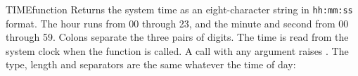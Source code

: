 \begin{XbaseEntry}{TIME}{function}
Returns the system time as an eight-character string in \texttt{hh:mm:ss} format.
\Syntax
{}
\Usage
The hour runs from 00 through 23, and the minute and second from 00 through
59. Colons separate the three pairs of digits. The time is read from the
system clock when the function is called. A call with any argument raises
.
\Examples
The type, length and separators are the same whatever the time of day:
\end{XbaseEntry}


